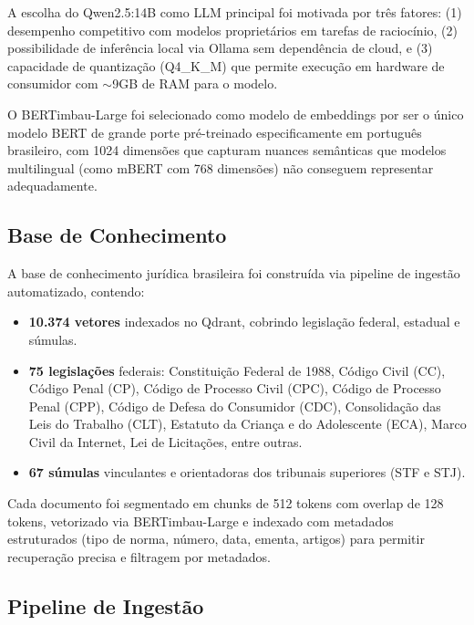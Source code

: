 \documentclass[journal,10pt]{IEEEtran}
\begin{document}
A escolha do Qwen2.5:14B como LLM principal foi motivada por tr\^{e}s fatores: (1) desempenho competitivo com modelos propriet\'{a}rios em tarefas de racioc\'{i}nio, (2) possibilidade de infer\^{e}ncia local via Ollama sem depend\^{e}ncia de cloud, e (3) capacidade de quantiza\c{c}\~{a}o (Q4\_K\_M) que permite execu\c{c}\~{a}o em hardware de consumidor com $\sim$9GB de RAM para o modelo.

O BERTimbau-Large foi selecionado como modelo de embeddings por ser o \'{u}nico modelo BERT de grande porte pr\'{e}-treinado especificamente em portugu\^{e}s brasileiro, com 1024 dimens\~{o}es que capturam nuances sem\^{a}nticas que modelos multilingual (como mBERT com 768 dimens\~{o}es) n\~{a}o conseguem representar adequadamente.

\subsection{Base de Conhecimento}

A base de conhecimento jur\'{i}dica brasileira foi constru\'{i}da via pipeline de ingest\~{a}o automatizado, contendo:

\begin{itemize}    \item \textbf{10.374 vetores} indexados no Qdrant, cobrindo legisla\c{c}\~{a}o federal, estadual e s\'{u}mulas.
    \item \textbf{75 legisla\c{c}\~{o}es} federais: Constitui\c{c}\~{a}o Federal de 1988, C\'{o}digo Civil (CC), C\'{o}digo Penal (CP), C\'{o}digo de Processo Civil (CPC), C\'{o}digo de Processo Penal (CPP), C\'{o}digo de Defesa do Consumidor (CDC), Consolida\c{c}\~{a}o das Leis do Trabalho (CLT), Estatuto da Crian\c{c}a e do Adolescente (ECA), Marco Civil da Internet, Lei de Licita\c{c}\~{o}es, entre outras.
    \item \textbf{67 s\'{u}mulas} vinculantes e orientadoras dos tribunais superiores (STF e STJ).
\end{itemize}

Cada documento foi segmentado em chunks de 512 tokens com overlap de 128 tokens, vetorizado via BERTimbau-Large e indexado com metadados estruturados (tipo de norma, n\'{u}mero, data, ementa, artigos) para permitir recupera\c{c}\~{a}o precisa e filtragem por metadados.

\subsection{Pipeline de Ingest\~{a}o}
\end{document}
